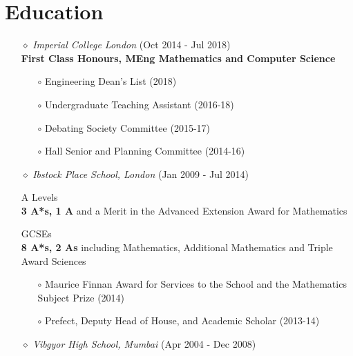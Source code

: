 \documentclass[a4paper]{article}
\begin{document}

\vspace{-10pt}
\section*{Education}
\vspace{-7pt}

\begin{itemize}

\item[$\diamond$] \textit{Imperial College London} (Oct 2014 - Jul 2018)	\\
	\textbf{First Class Honours, MEng Mathematics and Computer Science}

\begin{itemize}
\item[$\circ$] Engineering Dean's List (2018)
\item[$\circ$] Undergraduate Teaching Assistant (2016-18)
\item[$\circ$] Debating Society Committee (2015-17)
\item[$\circ$] Hall Senior and Planning Committee (2014-16)
\end{itemize}

\item[$\diamond$] \textit{Ibstock Place School, London} (Jan 2009 - Jul 2014)

A Levels \\
\textbf{3 A*s, 1 A} and a Merit in the Advanced Extension Award for Mathematics

GCSEs \\
\textbf{8 A*s, 2 As} including Mathematics, Additional Mathematics and Triple Award Sciences
	
\begin{itemize}
\item[$\circ$] Maurice Finnan Award for Services to the School and the Mathematics Subject Prize (2014)
\item[$\circ$] Prefect, Deputy Head of House, and Academic Scholar (2013-14)
\end{itemize}	

\item[$\diamond$] \textit{Vibgyor High School, Mumbai} (Apr 2004 - Dec 2008)

\end{itemize}

\end{document}
